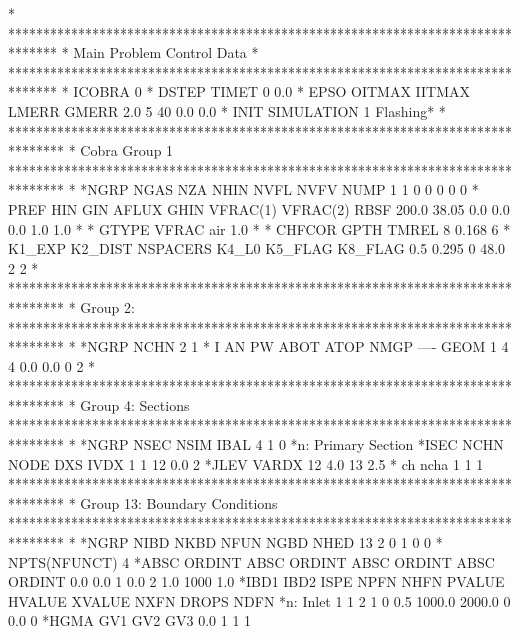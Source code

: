 *
*******************************************************************************
* Main Problem Control Data                                                   *
*******************************************************************************
*       ICOBRA
             0
*        DSTEP         TIMET
             0           0.0
*         EPSO        OITMAX        IITMAX         LMERR         GMERR
           2.0             5            40           0.0           0.0
*     INIT                                                           SIMULATION
         1                                                    Flashing*
*
********************************************************************************
* Cobra Group 1
********************************************************************************
*
*NGRP NGAS  NZA NHIN NVFL NVFV NUMP 
    1    1    0    0    0    0    0
*     PREF       HIN       GIN     AFLUX      GHIN  VFRAC(1)  VFRAC(2)      RBSF
     200.0     38.05                 0.0       0.0       0.0       1.0       1.0
*
*  GTYPE       VFRAC
air              1.0
*
*   CHFCOR      GPTH     TMREL
         8     0.168         6
*       K1_EXP       K2_DIST      NSPACERS         K4_L0       K5_FLAG   K8_FLAG
           0.5         0.295             0          48.0             2         2
*
********************************************************************************
* Group 2: 
********************************************************************************
*
*NGRP NCHN
    2    1
*   I   AN   PW ABOT ATOP NMGP ---- GEOM
    1    4    4  0.0  0.0    0         2
*
********************************************************************************
* Group 4: Sections
********************************************************************************
*
*NGRP NSEC NSIM IBAL
    4    1    0
*n: Primary Section
*ISEC NCHN NODE       DXS IVDX
    1    1   12       0.0    2
*JLEV     VARDX 
   12       4.0   13       2.5
*  ch ncha
    1    1                             1
********************************************************************************
* Group 13: Boundary Conditions
********************************************************************************
*
*NGRP NIBD NKBD NFUN NGBD NHED     
   13    2    0    1    0    0
* NPTS(NFUNCT)
    4
*ABSC    ORDINT ABSC    ORDINT ABSC    ORDINT ABSC    ORDINT
  0.0       0.0    1       0.0    2       1.0 1000       1.0
*IBD1 IBD2 ISPE NPFN NHFN    PVALUE    HVALUE    XVALUE NXFN     DROPS NDFN 
*n: Inlet
    1    1    2    1    0       0.5    1000.0    2000.0    0       0.0    0 
*HGMA  GV1  GV2  GV3
  0.0    1    1    1
